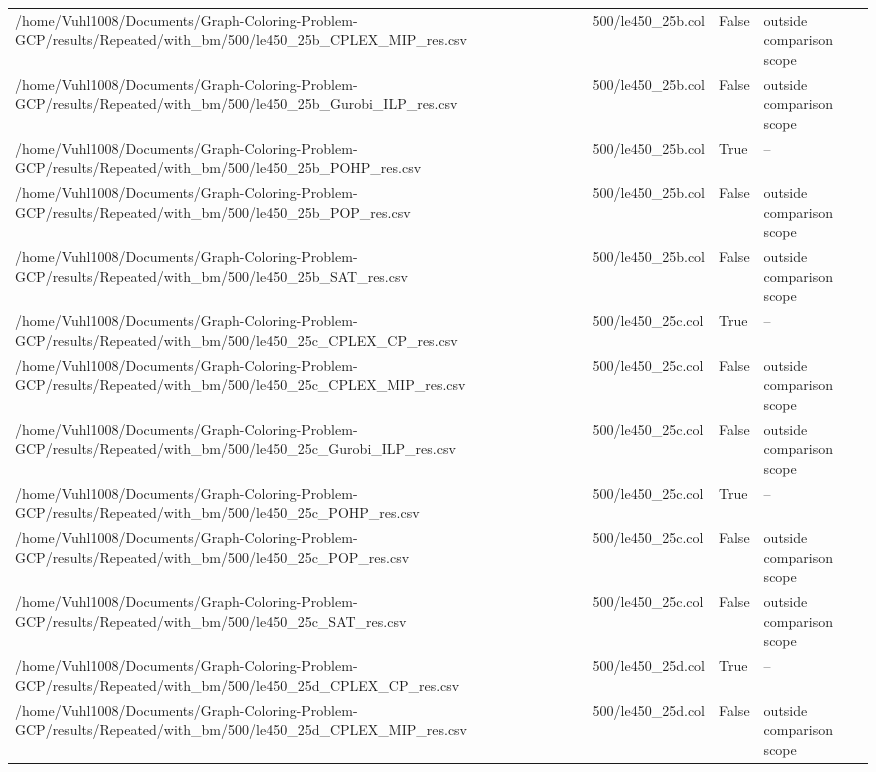 \begin{table}[htbp]
\begin{tabular}{llll}
/home/Vuhl1008/Documents/Graph-Coloring-Problem-GCP/results/Repeated/with\_bm/500/le450\_25b\_CPLEX\_MIP\_res.csv & 500/le450\_25b.col & False & outside comparison scope \\
/home/Vuhl1008/Documents/Graph-Coloring-Problem-GCP/results/Repeated/with\_bm/500/le450\_25b\_Gurobi\_ILP\_res.csv & 500/le450\_25b.col & False & outside comparison scope \\
/home/Vuhl1008/Documents/Graph-Coloring-Problem-GCP/results/Repeated/with\_bm/500/le450\_25b\_POHP\_res.csv & 500/le450\_25b.col & True & -- \\
/home/Vuhl1008/Documents/Graph-Coloring-Problem-GCP/results/Repeated/with\_bm/500/le450\_25b\_POP\_res.csv & 500/le450\_25b.col & False & outside comparison scope \\
/home/Vuhl1008/Documents/Graph-Coloring-Problem-GCP/results/Repeated/with\_bm/500/le450\_25b\_SAT\_res.csv & 500/le450\_25b.col & False & outside comparison scope \\
/home/Vuhl1008/Documents/Graph-Coloring-Problem-GCP/results/Repeated/with\_bm/500/le450\_25c\_CPLEX\_CP\_res.csv & 500/le450\_25c.col & True & -- \\
/home/Vuhl1008/Documents/Graph-Coloring-Problem-GCP/results/Repeated/with\_bm/500/le450\_25c\_CPLEX\_MIP\_res.csv & 500/le450\_25c.col & False & outside comparison scope \\
/home/Vuhl1008/Documents/Graph-Coloring-Problem-GCP/results/Repeated/with\_bm/500/le450\_25c\_Gurobi\_ILP\_res.csv & 500/le450\_25c.col & False & outside comparison scope \\
/home/Vuhl1008/Documents/Graph-Coloring-Problem-GCP/results/Repeated/with\_bm/500/le450\_25c\_POHP\_res.csv & 500/le450\_25c.col & True & -- \\
/home/Vuhl1008/Documents/Graph-Coloring-Problem-GCP/results/Repeated/with\_bm/500/le450\_25c\_POP\_res.csv & 500/le450\_25c.col & False & outside comparison scope \\
/home/Vuhl1008/Documents/Graph-Coloring-Problem-GCP/results/Repeated/with\_bm/500/le450\_25c\_SAT\_res.csv & 500/le450\_25c.col & False & outside comparison scope \\
/home/Vuhl1008/Documents/Graph-Coloring-Problem-GCP/results/Repeated/with\_bm/500/le450\_25d\_CPLEX\_CP\_res.csv & 500/le450\_25d.col & True & -- \\
/home/Vuhl1008/Documents/Graph-Coloring-Problem-GCP/results/Repeated/with\_bm/500/le450\_25d\_CPLEX\_MIP\_res.csv & 500/le450\_25d.col & False & outside comparison scope \\

\end{tabular}
\end{table}
